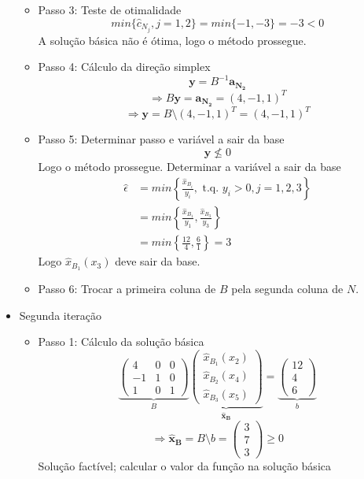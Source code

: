 \documentclass[a4paper, 12pt]{article}
\begin{document}
\begin{itemize}
\begin{itemize}
\begin{itemize}
		\end{itemize}
		\item Passo 3: Teste de otimalidade
\[
min\{ \hat{c}_{N_j}, j=1,2\}=min\{ -1, -3\}=-3<0
\]
A solução básica não é ótima, logo o método prossegue.
		\item Passo 4: Cálculo da direção simplex
\[
\mathbf{y}=B^{-1}\mathbf{a_{N_2}}
\]
\[
\Rightarrow B \mathbf{y}=\mathbf{a_{N_2}}=(4, -1, 1)^T 
\]
\[
\Rightarrow \mathbf{y}= B\setminus(4, -1, 1)^T=(4, -1, 1)^T
\]
		\item Passo 5: Determinar passo e variável a sair da base
\[
\mathbf{y}\nleq 0
\]
Logo o método prossegue. Determinar a variável a sair da base
\begin{align}
\hat{\epsilon}&=min\left\{
\frac{\hat{x}_{B_i}}{y_i},\text{ t.q. }y_i>0, j=1,2,3
\right\} \nonumber \\
&=min\left\{
\frac{\hat{x}_{B_1}}{y_1}, \frac{\hat{x}_{B_3}}{y_3}
\right\} \nonumber \\
&=min \left\{
\frac{12}{4}, \frac{6}{1}
\right\}
=3 \nonumber
\end{align}
Logo  $\hat{x}_{B_1} (x_3)$ deve sair da base.
		\item Passo 6: Trocar a primeira coluna de $B$ pela segunda coluna de $N$.
	\end{itemize}
	\item Segunda iteração
	\begin{itemize}
		\item Passo 1: Cálculo da solução básica
\[
\underbrace{
\begin{pmatrix}
4&0&0\\
-1&1&0\\
1&0&1
\end{pmatrix}}_B
\underbrace{
\begin{pmatrix}
\hat{x}_{B_1} (x_2)\\
\hat{x}_{B_2} (x_4)\\
\hat{x}_{B_3} (x_5)
\end{pmatrix}}_{\mathbf{\hat{x}_B}}
=
\underbrace{
\begin{pmatrix}
12\\
4\\
6
\end{pmatrix}}_{b}
\]
\[
\Rightarrow \mathbf{\hat{x}_B} = B \setminus b =
\begin{pmatrix}
3\\
7\\
3
\end{pmatrix}
\geq 0
\]
Solução factível; calcular o valor da função na solução básica

\end{itemize}
\end{itemize}
\end{document}
